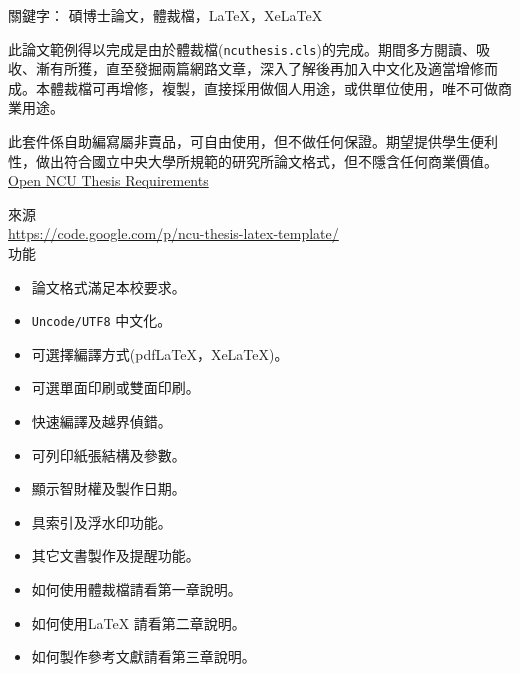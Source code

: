 \begin{abstractcn}

關鍵字： 碩博士論文，體裁檔，\LaTeX{}，Xe\LaTeX{}
\vspace{2em}

此論文範例得以完成是由於體裁檔({\tt ncuthesis.cls})的完成。期間多方閱讀、吸收、漸有所獲，直至發掘兩篇網路文章，深入了解後再加入中文化及適當增修而成。本體裁檔可再增修，複製，直接採用做個人用途，或供單位使用，唯不可做商業用途。

此套件係自助編寫屬非賣品，可自由使用，但不做任何保證。期望提供學生便利性，做出符合國立中央大學所規範的研究所論文格式，但不隱含任何商業價值。\href{./form03-02-02.doc}{Open NCU Thesis Requirements}

\begin{center}
來源\\
\url{https://code.google.com/p/ncu-thesis-latex-template/}\\
功能
\end{center}
\begin{itemize}
\item 論文格式滿足本校要求。
\item {\tt Uncode/UTF8} 中文化。
\item 可選擇編譯方式(pdf\LaTeX{}，Xe\LaTeX{})。
\item 可選單面印刷或雙面印刷。
\item 快速編譯及越界偵錯。
\item 可列印紙張結構及參數。
\item 顯示智財權及製作日期。
\item 具索引及浮水印功能。
\item 其它文書製作及提醒功能。
\item 如何使用體裁檔請看第一章說明。
\item 如何使用\LaTeX{} 請看第二章說明。
\item 如何製作參考文獻請看第三章說明。
\end{itemize}
\end{abstractcn} 